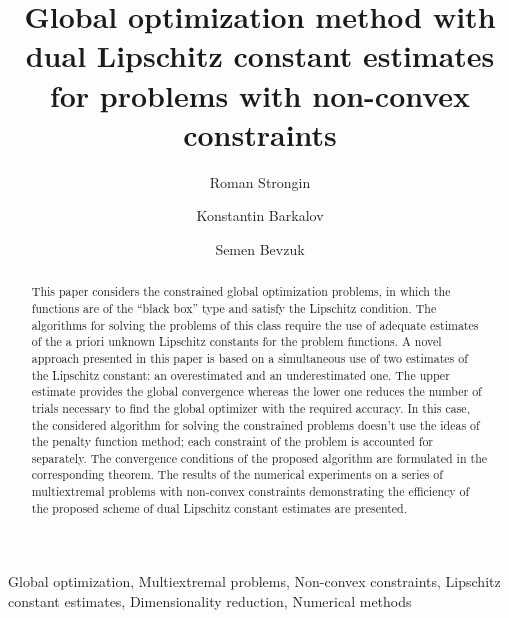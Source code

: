 \documentclass[review]{elsarticle}
\begin{document}
\begin{frontmatter}

\title{Global optimization method with dual Lipschitz constant estimates for problems with non-convex constraints}

\author{Roman Strongin}
\author{Konstantin Barkalov}
\author{Semen Bevzuk}
\address{Lobachevsky State University of Nizhni Novgorod, Nizhni Novgorod, Russia}

\begin{abstract}
This paper considers the constrained global optimization problems, in which the functions are of the “black box” type and satisfy the Lipschitz condition. The algorithms for solving the problems of this class require the use of adequate estimates of the a priori unknown Lipschitz constants for the problem functions. A novel approach presented in this paper is based on a simultaneous use of two estimates of the Lipschitz constant: an overestimated and an underestimated one. The upper estimate provides the global convergence whereas the lower one reduces the number of trials necessary to find the global optimizer with the required accuracy. In this case,  the considered algorithm for solving the constrained problems doesn’t use the ideas of the penalty function method; each constraint of the problem is accounted for separately. The convergence conditions of the proposed algorithm are formulated in the corresponding theorem. The results of the numerical experiments on a series of multiextremal problems with non-convex constraints demonstrating the efficiency of the proposed scheme of dual Lipschitz constant estimates are presented.
\end{abstract}

\begin{keyword}
Global optimization, Multiextremal problems, Non-convex constraints, Lipschitz constant estimates, Dimensionality reduction, Numerical methods
\end{keyword}

\end{frontmatter}

\linenumbers
\end{document}
